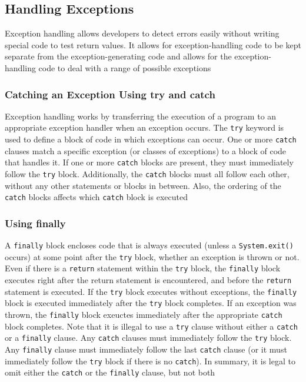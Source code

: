 \subsection{Handling Exceptions}
Exception handling allows developers to detect errors easily without writing 
special code to test return values. It allows for exception-handling code to be 
kept separate from the exception-generating code and allows for the 
exception-handling code to deal with a range of possible exceptions

\subsubsection{Catching an Exception Using try and catch}
Exception handling works by transferring the execution of a program to an 
appropriate exception handler when an exception occurs. The \verb#try# keyword 
is used to define a block of code in which exceptions can occur. One or more 
\verb#catch# clauses match a specific exception (or classes of exceptions) to a 
block of code that handles it. If one or more \verb#catch# blocks are present, 
they must immediately follow the \verb#try# block. Additionally, the 
\verb#catch# blocks must all follow each other, without any other statements or 
blocks in between. Also, the ordering of the \verb#catch# blocks affects which 
\verb#catch# block is executed

\subsubsection{Using finally}
A \verb#finally# block encloses code that is always executed (unless a 
\verb#System.exit()# occurs) at some point after the \verb#try# block, whether 
an exception is thrown or not. Even if there is a \verb#return# statement 
within the \verb#try# block, the \verb#finally# block executes right after the 
return statement is encountered, and before the \verb#return# statement is 
executed. If the \verb#try# block executes without exceptions, the 
\verb#finally# block is executed immediately after the \verb#try# block 
completes. If an exception was thrown, the \verb#finally# block exeuctes 
immediately after the appropriate \verb#catch# block completes. Note that it is 
illegal to use a \verb#try# clause without either a \verb#catch# or a 
\verb#finally# clause. Any \verb#catch# clauses must immediately follow the 
\verb#try# block. Any \verb#finally# clause must immediately follow the last 
\verb#catch# clause (or it must immediately follow the \verb#try# block if 
there is no \verb#catch#). In summary, it is legal to omit either the 
\verb#catch# or the \verb#finally# clause, but not both

